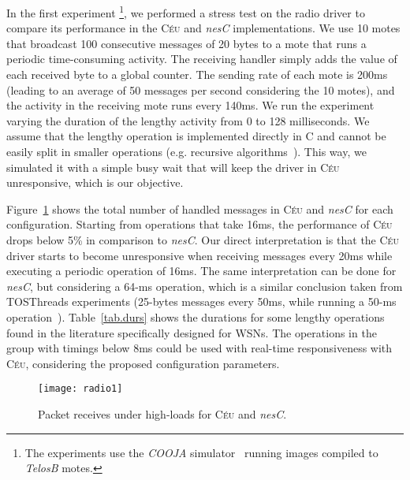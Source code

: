 \documentclass[10pt]{sensys-proc}
\newcommand{\CEU}{\textsc{C\'{e}u}\xspace}
\begin{document}
In the first experiment%
\footnote{The experiments use the \emph{COOJA} simulator~\cite{wsn.cooja} 
running images compiled to \emph{TelosB} motes.},
we performed a stress test on the radio driver to compare its performance in 
the \CEU and \emph{nesC} implementations.
We use 10 motes that broadcast 100 consecutive messages of 20 bytes to a mote 
that runs a periodic time-consuming activity.
The receiving handler simply adds the value of each received byte to a global 
counter.
%
The sending rate of each mote is 200ms (leading to an average of 50 messages 
per second considering the 10 motes), and the activity in the receiving mote 
runs every 140ms.
We run the experiment varying the duration of the lengthy activity from 0 to 
128 milliseconds.
%
We assume that the lengthy operation is implemented directly in C and cannot be 
easily split in smaller operations (e.g. recursive 
algorithms~\cite{wsn.comparison,wsn.tosthreads}).
This way, we simulated it with a simple busy wait that will keep the driver in 
\CEU unresponsive, which is our objective.

Figure~\ref{fig.radio1} shows the total number of handled messages in \CEU and 
\emph{nesC} for each configuration.
%
Starting from operations that take 16ms, the performance of \CEU drops below 
5\% in comparison to \emph{nesC}.
%
Our direct interpretation is that the \CEU driver starts to become unresponsive 
when receiving messages every 20ms while executing a periodic operation of 
16ms.
The same interpretation can be done for \emph{nesC}, but considering a 64-ms 
operation, which is a similar conclusion taken from TOSThreads experiments 
(25-bytes messages every 50ms, while running a 50-ms 
operation~\cite{wsn.tosthreads}).
%
Table~\ref{tab.durs} shows the durations for some lengthy operations found in 
the literature specifically designed for WSNs.
The operations in the group with timings below 8ms could be used with real-time 
responsiveness with \CEU, considering the proposed configuration parameters.

\begin{figure}[t]
\texttt{[image: radio1]}
\caption{ Packet receives under high-loads for \CEU and \emph{nesC}.
\label{fig.radio1}
}
\end{figure}
\end{document}
